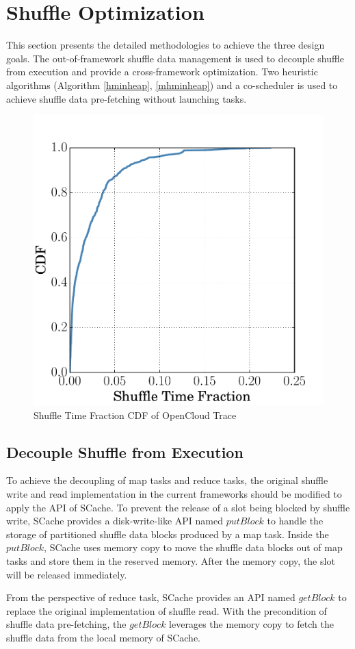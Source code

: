 \section{Shuffle Optimization}
\label{opt}
This section presents the detailed methodologies to achieve the three design goals. 
The out-of-framework shuffle data management is used to decouple shuffle from execution and provide a cross-framework optimization. 
Two heuristic algorithms (Algorithm \ref{hminheap}, \ref{mhminheap}) and a co-scheduler is used to achieve shuffle data pre-fetching without launching tasks.
\begin{figure}
	\centering
	\includegraphics[width=0.5\linewidth]{fig/reduce_cdf}
	\caption{Shuffle Time Fraction CDF of OpenCloud Trace}
	\label{fig:cdf}
	\vspace{-1em}
\end{figure}
\subsection{Decouple Shuffle from Execution}
To achieve the decoupling of map tasks and reduce tasks, the original shuffle write and read implementation in the current frameworks should be modified to apply the API of SCache.
To prevent the release of a slot being blocked by shuffle write,  
SCache provides a disk-write-like API named $putBlock$ to handle the storage of partitioned shuffle data blocks produced by a map task.
Inside the $putBlock$, SCache uses memory copy to move the shuffle data blocks out of map tasks and store them in the reserved memory.
After the memory copy, the slot will be released immediately.

From the perspective of reduce task, SCache provides an API named $getBlock$ to replace the original implementation of shuffle read. 
With the precondition of shuffle data pre-fetching, 
the $getBlock$ leverages the memory copy to fetch the shuffle data from the local memory of SCache.
